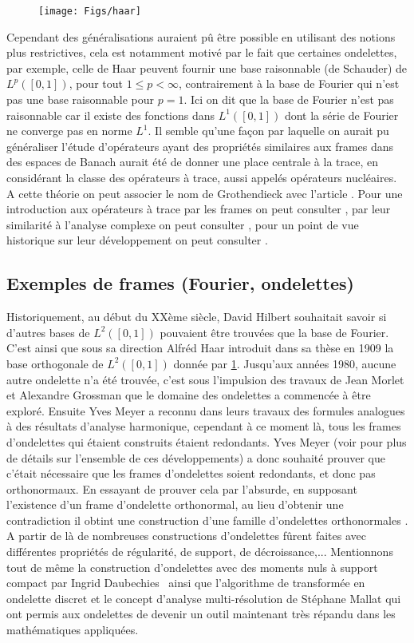 \begin{figure}
	\centering
	\texttt{[image: Figs/haar]}
	\label{fig:haar}	
\end{figure}
	
	Cependant des généralisations auraient pû être possible en utilisant des notions plus restrictives, cela est notamment motivé par le fait que certaines ondelettes, par exemple, celle de Haar peuvent fournir une base raisonnable (de Schauder) de $L^p([0,1])$, pour tout $1 \leq p < \infty$, contrairement à la base de Fourier qui n'est pas une base raisonnable pour $p=1$.
	Ici on dit que la base de Fourier n'est pas raisonnable car il existe des fonctions dans $L^1([0,1])$ dont la série de Fourier ne converge pas en norme $L^1$.
	\newline
	Il semble qu'une façon par laquelle on aurait pu généraliser l'étude d'opérateurs ayant des propriétés similaires aux frames dans des espaces de Banach aurait été de donner une place centrale à la trace, en considérant la classe des opérateurs à trace, aussi appelés opérateurs nucléaires.
	A cette théorie on peut associer le nom de Grothendieck avec l'article \cite{groth}. 
	Pour une introduction aux opérateurs à trace par les frames on peut consulter \cite{traceclass}, par leur similarité à l'analyse complexe on peut consulter \cite{acQuef}, pour un point de vue historique sur leur développement on peut consulter \cite{surlestraces}. 
\subsection{Exemples de frames (Fourier, ondelettes)}
Historiquement, au début du XXème siècle, David Hilbert souhaitait savoir si d'autres bases de $L^2([0,1])$ pouvaient être trouvées que la base de Fourier.
C'est ainsi que sous sa direction Alfréd Haar introduit dans sa thèse \cite{haar} en 1909 la base orthogonale de $L^2([0,1])$ donnée par \ref{fig:haar}.
Jusqu'aux années 1980, aucune autre ondelette n'a été trouvée, c'est sous l'impulsion des travaux de Jean Morlet et Alexandre Grossman que le domaine des ondelettes a commencée à être exploré.
Ensuite Yves Meyer a reconnu dans leurs travaux des formules analogues à des résultats d'analyse harmonique, cependant à ce moment là, tous les frames d'ondelettes qui étaient construits étaient redondants.
Yves Meyer (voir \cite{daubpers} pour plus de détails sur l'ensemble de ces développements) a donc souhaité prouver que c'était nécessaire que les frames d'ondelettes soient redondants, et donc pas orthonormaux.
En essayant de prouver cela par l'absurde, en supposant l'existence d'un frame d'ondelette orthonormal, au lieu d'obtenir une contradiction il obtint une construction d'une famille d'ondelettes orthonormales \cite{meyer}.
A partir de là de nombreuses constructions d'ondelettes fûrent faites avec différentes propriétés de régularité, de support, de décroissance,... 
Mentionnons tout de même la construction d'ondelettes avec des moments nuls à support compact par Ingrid Daubechies \cite{daubbook} ainsi que l'algorithme de transformée en ondelette discret et le concept d'analyse multi-résolution de Stéphane Mallat \cite{mallatbook} qui ont permis aux ondelettes de devenir un outil maintenant très répandu dans les mathématiques appliquées.

